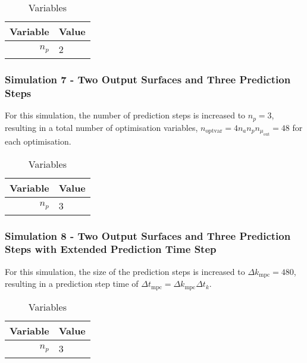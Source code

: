 \documentclass[conference]{IEEEtran}
\begin{document}
\begin{table}[]
    \centering
    \caption{Variables}
    \label{tab:settings_SS06}
    \begin{tabular}{r|l}
        \toprule
        Variable & Value \\
        \midrule
        $n_{p}$ & 2 \\
        \bottomrule
    \end{tabular}
\end{table}

\subsubsection{Simulation 7 - Two Output Surfaces and Three Prediction Steps} \label{subsubsec:SS07}
For this simulation, the number of prediction steps is increased to $n_{p} = 3$, resulting in a total number of optimisation variables, $n_{\text{optvar}} = 4 n_{a} n_{p} n_{\mu_{\text{out}}} = 48$ for each optimisation.

\begin{table}[]
    \centering
    \caption{Variables}
    \label{tab:settings_SS07}
    \begin{tabular}{r|l}
        \toprule
        Variable & Value \\
        \midrule
        $n_{p}$ & 3 \\
        \bottomrule
    \end{tabular}
\end{table}

\subsubsection{Simulation 8 - Two Output Surfaces and Three Prediction Steps with Extended Prediction Time Step} \label{subsubsec:SS08}
For this simulation, the size of the prediction steps is increased to $\Delta k_{\text{mpc}} = 480$, resulting in a prediction step time of $\Delta t_{\text{mpc}} =  \Delta k_{\text{mpc}} \Delta t_{k}$.

\begin{table}[]
    \centering
    \caption{Variables}
    \label{tab:settings_SS08}
    \begin{tabular}{r|l}
        \toprule
        Variable & Value \\
        \midrule
        $n_{p}$ & 3 \\
        \bottomrule
    \end{tabular}
\end{table}
\end{document}
